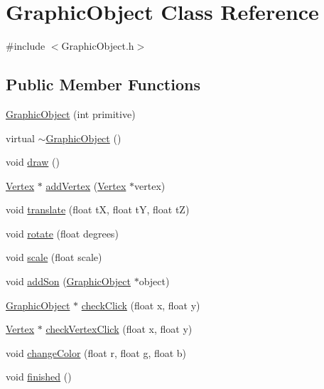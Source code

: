 \hypertarget{class_graphic_object}{}\section{Graphic\+Object Class Reference}
\label{class_graphic_object}


{\ttfamily \#include $<$Graphic\+Object.\+h$>$}

\subsection*{Public Member Functions}
\begin{DoxyCompactItemize}
\item 
\hyperlink{class_graphic_object_a29887ed3ec4ffaaae6d2d7f28ac048dd}{Graphic\+Object} (int primitive)
\item 
virtual \hyperlink{class_graphic_object_a8596b0e8d386731cfd19661eeef45296}{$\sim$\+Graphic\+Object} ()
\item 
void \hyperlink{class_graphic_object_a1daf1518ce33d49238fdd38be1c1005b}{draw} ()
\item 
\hyperlink{class_vertex}{Vertex} $\ast$ \hyperlink{class_graphic_object_ae68989c0381c4bef18208068de62af74}{add\+Vertex} (\hyperlink{class_vertex}{Vertex} $\ast$vertex)
\item 
void \hyperlink{class_graphic_object_a3fd446fb03658eb4119298db5d7182c6}{translate} (float t\+X, float t\+Y, float t\+Z)
\item 
void \hyperlink{class_graphic_object_aa51dede9d1b13aec64f64e1877ee9f81}{rotate} (float degrees)
\item 
void \hyperlink{class_graphic_object_aa587ad45dad9bb9ec59046c2d9d698c9}{scale} (float scale)
\item 
void \hyperlink{class_graphic_object_a6606911d41819e589ea73047117a0e01}{add\+Son} (\hyperlink{class_graphic_object}{Graphic\+Object} $\ast$object)
\item 
\hyperlink{class_graphic_object}{Graphic\+Object} $\ast$ \hyperlink{class_graphic_object_a64f5765caa33b38e72cc0179a0ce38eb}{check\+Click} (float x, float y)
\item 
\hyperlink{class_vertex}{Vertex} $\ast$ \hyperlink{class_graphic_object_ab5301d401d7a931a63a3e03dd00c4e6b}{check\+Vertex\+Click} (float x, float y)
\item 
void \hyperlink{class_graphic_object_a9a597def2d6b4b4c75a319111e21b202}{change\+Color} (float r, float g, float b)
\item 
void \hyperlink{class_graphic_object_a28912ebe3bf736083f20998d6a6ee7ec}{finished} ()

\end{DoxyCompactItemize}
